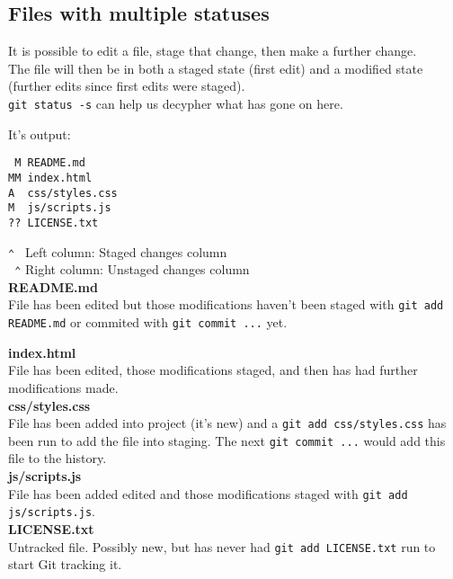 \subsection{Files with multiple statuses}

It is possible to edit a file, stage that change, then make a further change.
\\

The file will then be in both a staged state (first edit) and a modified state (further edits since first edits were staged).
\\

\texttt{git status -s} can help us decypher what has gone on here.

It's output:

\begin{verbatim}
 M README.md
MM index.html
A  css/styles.css
M  js/scripts.js
?? LICENSE.txt
\end{verbatim}

\texttt{⌃ } Left column: Staged changes column
\\
\texttt{ ⌃} Right column: Unstaged changes column
\\

\textbf{README.md}
\\
File has been edited but those modifications haven't been staged with \texttt{git add README.md} or commited with \texttt{git commit ...} yet.


\textbf{index.html}
\\
File has been edited, those modifications staged, and then has had further modifications made.
\\

\textbf{css/styles.css}
\\
File has been added into project (it's new) and a \texttt{git add css/styles.css} has been run to add the file into staging. The next \texttt{git commit ...} would add this file to the history.
\\

\textbf{js/scripts.js}
\\
File has been added edited and those modifications staged with \texttt{git add js/scripts.js}.
\\

\textbf{LICENSE.txt}
\\
Untracked file. Possibly new, but has never had \texttt{git add LICENSE.txt} run to start Git tracking it.
\\



